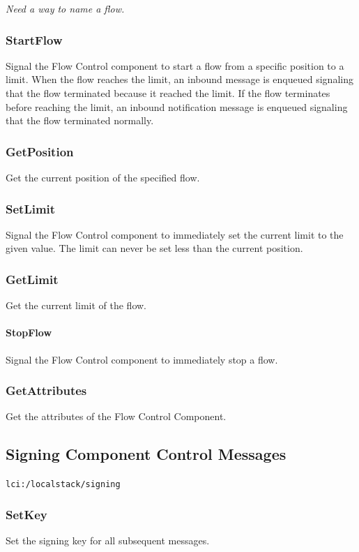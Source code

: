 {\it Need a way to name a flow.}

\subsubsection{StartFlow}
Signal the Flow Control component to start a flow from a specific position to a limit.
When the flow reaches the limit,
an inbound message is enqueued signaling that the flow terminated because it reached the limit.
If the flow terminates before reaching the limit,
an inbound notification message is enqueued signaling that the flow terminated normally.

\subsubsection{GetPosition}
Get the current position of the specified flow.

\subsubsection{SetLimit}
Signal the Flow Control component to immediately set the current limit to the given value.
The limit can never be set less than the current position.

\subsubsection{GetLimit}
Get the current limit of the flow.

\paragraph{StopFlow}
Signal the Flow Control component to immediately stop a flow.

\subsubsection{GetAttributes}
Get the attributes of the Flow Control Component.

\subsection{Signing Component Control Messages}
{\tt lci:/localstack/signing}

\subsubsection{SetKey}
Set the signing key for all subsequent messages.

